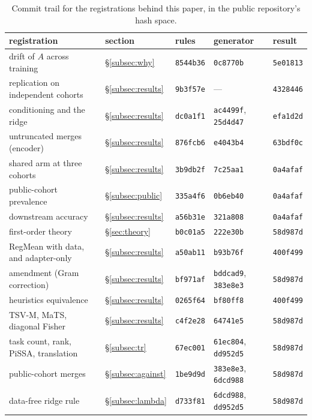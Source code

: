 \begin{table}[pos=h]
\centering
\small
\caption{Commit trail for the registrations behind this paper, in the public
repository's hash space.}
\label{tab:commits}
\begin{tabular}{p{5.2cm}llp{2.2cm}l}
\toprule
registration & section & rules & generator & result \\
\midrule
drift of $A$ across training & \S\ref{subsec:why} & \texttt{8544b36} & \texttt{0c8770b} & \texttt{5e01813} \\
replication on independent cohorts & \S\ref{subsec:results} & \texttt{9b3f57e} & --- & \texttt{4328446} \\
conditioning and the ridge & \S\ref{subsec:results} & \texttt{dc0a1f1} & \texttt{ac4499f}, \texttt{25d4d47} & \texttt{efa1d2d} \\
untruncated merges (encoder) & \S\ref{subsec:results} & \texttt{876fcb6} & \texttt{e4043b4} & \texttt{63bdf0c} \\
shared arm at three cohorts & \S\ref{subsec:results} & \texttt{3b9db2f} & \texttt{7c25aa1} & \texttt{0a4afaf} \\
public-cohort prevalence & \S\ref{subsec:public} & \texttt{335a4f6} & \texttt{0b6eb40} & \texttt{0a4afaf} \\
downstream accuracy & \S\ref{subsec:results} & \texttt{a56b31e} & \texttt{321a808} & \texttt{0a4afaf} \\
\addlinespace
first-order theory & \S\ref{sec:theory} & \texttt{b0c01a5} & \texttt{222e30b} & \texttt{58d987d} \\
RegMean with data, and adapter-only & \S\ref{subsec:results} & \texttt{a50ab11} & \texttt{b93b76f} & \texttt{400f499} \\
\quad amendment (Gram correction) & \S\ref{subsec:results} & \texttt{bf971af} & \texttt{bddcad9}, \texttt{383e8e3} & \texttt{58d987d} \\
heuristics equivalence & \S\ref{subsec:results} & \texttt{0265f64} & \texttt{bf80ff8} & \texttt{400f499} \\
TSV-M, MaTS, diagonal Fisher & \S\ref{subsec:results} & \texttt{c4f2e28} & \texttt{64741e5} & \texttt{58d987d} \\
task count, rank, PiSSA, translation & \S\ref{subsec:tr} & \texttt{67ec001} & \texttt{61ec804}, \texttt{dd952d5} & \texttt{58d987d} \\
public-cohort merges & \S\ref{subsec:against} & \texttt{1be9d9d} & \texttt{383e8e3}, \texttt{6dcd988} & \texttt{58d987d} \\
data-free ridge rule & \S\ref{subsec:lambda} & \texttt{d733f81} & \texttt{6dcd988}, \texttt{dd952d5} & \texttt{58d987d} \\

\end{tabular}
\end{table}
